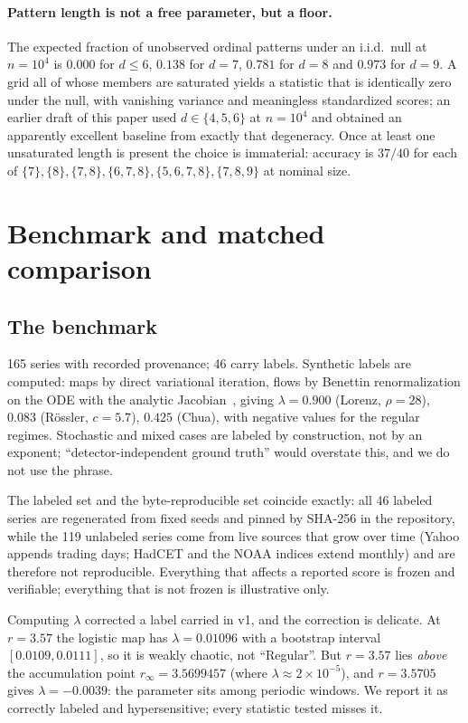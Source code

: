 \documentclass[11pt]{article}
\begin{document}
\paragraph{Pattern length is not a free parameter, but a floor.} The expected
fraction of unobserved ordinal patterns under an i.i.d.\ null at $n=10^4$ is
$0.000$ for $d\le 6$, $0.138$ for $d=7$, $0.781$ for $d=8$ and $0.973$ for
$d=9$. A grid all of whose members are saturated yields a statistic that is
identically zero under the null, with vanishing variance and meaningless
standardized scores; an earlier draft of this paper used $d\in\{4,5,6\}$ at
$n=10^4$ and obtained an apparently excellent baseline from exactly that
degeneracy. Once at least one unsaturated length is present the choice is
immaterial: accuracy is $37/40$ for each of
$\{7\},\{8\},\{7,8\},\{6,7,8\},\{5,6,7,8\},\{7,8,9\}$ at nominal size.

\section{Benchmark and matched comparison}
\label{sec:bench}

\subsection{The benchmark}

165 series with recorded provenance; 46 carry labels. Synthetic labels are
computed: maps by direct variational iteration, flows by Benettin
renormalization on the ODE with the analytic Jacobian~\cite{benettin}, giving
$\lambda=0.900$ (Lorenz, $\rho=28$), $0.083$ (R\"ossler, $c=5.7$), $0.425$
(Chua), with negative values for the regular regimes. Stochastic and mixed cases
are labeled by construction, not by an exponent; ``detector-independent ground
truth'' would overstate this, and we do not use the phrase.

The labeled set and the byte-reproducible set coincide exactly: all 46 labeled
series are regenerated from fixed seeds and pinned by SHA-256 in the repository,
while the 119 unlabeled series come from live sources that grow over time
(Yahoo appends trading days; HadCET and the NOAA indices extend monthly) and are
therefore not reproducible. Everything that affects a reported score is frozen
and verifiable; everything that is not frozen is illustrative only.

Computing $\lambda$ corrected a label carried in v1, and the correction is
delicate. At $r=3.57$ the logistic map has $\lambda=0.01096$ with a bootstrap
interval $[0.0109,0.0111]$, so it is weakly chaotic, not ``Regular''. But
$r=3.57$ lies \emph{above} the accumulation point $r_\infty=3.5699457$ (where
$\lambda\approx2\times10^{-5}$), and $r=3.5705$ gives $\lambda=-0.0039$: the
parameter sits among periodic windows. We report it as correctly labeled and
hypersensitive; every statistic tested misses it.
\end{document}
